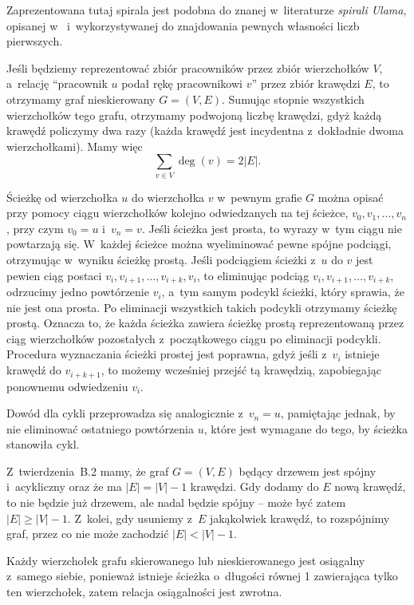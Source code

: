 Zaprezentowana tutaj spirala jest podobna do znanej w~literaturze \emph{spirali Ulama}, opisanej w~\cite{ulamspiral} i~wykorzystywanej do znajdowania pewnych własności liczb pierwszych.


\exercise %
Jeśli będziemy reprezentować zbiór pracowników przez zbiór wierzchołków $V$, a~relację ``pracownik $u$ podał rękę pracownikowi $v$'' przez zbiór krawędzi $E$, to otrzymamy graf nieskierowany $G=(V,E)$. Sumując stopnie wszystkich wierzchołków tego grafu, otrzymamy podwojoną liczbę krawędzi, gdyż każdą krawędź policzymy dwa razy (każda krawędź jest incydentna z~dokładnie dwoma wierzchołkami). Mamy więc
\[
	\sum_{v\in V}\deg(v) = 2|E|.
\]

\exercise %
Ścieżkę od wierzchołka $u$ do wierzchołka $v$ w~pewnym grafie $G$ można opisać przy pomocy ciągu wierzchołków kolejno odwiedzanych na tej ścieżce, $v_0,v_1,\dots,v_n$, przy czym $v_0=u$ i~$v_n=v$. Jeśli ścieżka jest prosta, to wyrazy w~tym ciągu nie powtarzają się. W~każdej ścieżce można wyeliminować pewne spójne podciągi, otrzymując w~wyniku ścieżkę prostą. Jeśli podciągiem ścieżki z~$u$ do $v$ jest pewien ciąg postaci $v_i,v_{i+1},\dots,v_{i+k},v_i$, to eliminując podciąg $v_i,v_{i+1},\dots,v_{i+k}$, odrzucimy jedno powtórzenie $v_i$, a~tym samym podcykl ścieżki, który sprawia, że nie jest ona prosta. Po eliminacji wszystkich takich podcykli otrzymamy ścieżkę prostą. Oznacza to, że każda ścieżka zawiera ścieżkę prostą reprezentowaną przez ciąg wierzchołków pozostałych z~początkowego ciągu po eliminacji podcykli. Procedura wyznaczania ścieżki prostej jest poprawna, gdyż jeśli z~$v_i$ istnieje krawędź do $v_{i+k+1}$, to możemy wcześniej przejść tą krawędzią, zapobiegając ponownemu odwiedzeniu $v_i$.

Dowód dla cykli przeprowadza się analogicznie z~$v_n=u$, pamiętając jednak, by nie eliminować ostatniego powtórzenia $u$, które jest wymagane do tego, by ścieżka stanowiła cykl.

\exercise %
Z~twierdzenia~B.2 mamy, że graf $G=(V,E)$ będący drzewem jest spójny i~acykliczny oraz że ma $|E|=|V|-1$ krawędzi. Gdy dodamy do $E$ nową krawędź, to nie będzie już drzewem, ale nadal będzie spójny -- może być zatem $|E|\ge|V|-1$. Z~kolei, gdy usuniemy z~$E$ jakąkolwiek krawędź, to rozspójnimy graf, przez co nie może zachodzić $|E|<|V|-1$.

\exercise %
Każdy wierzchołek grafu skierowanego lub nieskierowanego jest osiągalny z~samego siebie, ponieważ istnieje ścieżka o~długości równej 1 zawierająca tylko ten wierzchołek, zatem relacja osiągalności jest zwrotna.

